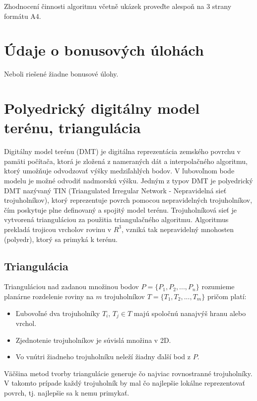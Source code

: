 \documentclass[11pt]{article}
\begin{document}
Zhodnocení činnosti algoritmu včetně ukázek proveďte alespoň na 3 strany formátu A4.
\section{Údaje o bonusových úlohách}
Neboli riešené žiadne bonusové úlohy.



\setlength{\parindent}{1cm}
\newpage
\section{Polyedrický digitálny model terénu, triangulácia}
Digitálny model terénu (DMT) je digitálna reprezentácia zemského povrchu v pamäti počítača, ktorá je zložená z nameraných dát a interpolačného algoritmu, ktorý umožňuje odvodzovať výšky medziľahlých bodov. V ľubovoľnom bode modelu je možné odvodiť nadmorskú výšku.\newline
Jedným z typov DMT je polyedrický DMT nazývaný TIN (Triangulated Irregular Network - Nepravidelná sieť trojuholníkov), ktorý reprezentuje povrch pomocou nepravidelných trojuholníkov, čím poskytuje plne definovaný a spojitý model terénu. Trojuholníková sieť je vytvorená trianguláciou za použitia triangulačného algoritmu. Algoritmus prekladá trojicou vrcholov rovinu v $R^3$, vzniká tak nepravidelný mnohosten (polyedr), ktorý sa primyká k terénu.
\subsection{Triangulácia}
Trianguláciou nad zadanou množinou bodov $P = \{P_1, P_2, ..., P_n\}$ rozumieme planárne rozdelenie roviny na $m$ trojuholníkov $T = \{T_1, T_2, ..., T_m\}$ pričom platí:
\begin{itemize}
    \item \parindent Ľubovoľné dva trojuholníky $T_i$, $T_j \in T$ majú spoločnú nanajvýš hranu alebo vrchol.
    \item \parindent Zjednotenie trojuholníkov je súvislá množina v 2D.
    \item \parindent Vo vnútri žiadneho trojuholníku neleží žiadny ďalší bod z $P$.
\end{itemize}
Väčšina metod tvorby triangulácie generuje čo najviac rovnostranné trojuholníky. V takomto prípade každý trojuholník by mal čo najlepšie lokálne reprezentovať povrch, tj. najlepšie sa k nemu primykať.
\end{document}
